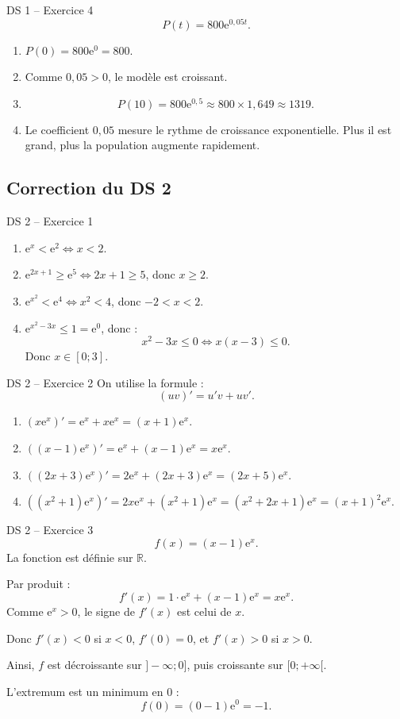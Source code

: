\documentclass[11pt,a4paper]{article}
\newcommand{\R}{\mathbb{R}}
\newcommand{\e}{\mathrm{e}}
\begin{document}
\begin{correctionbox}{DS 1 -- Exercice 4}
\[
P(t)=800\e^{0,05t}.
\]
\begin{enumerate}
    \item $P(0)=800\e^0=800$.
    \item Comme $0,05>0$, le modèle est croissant.
    \item
    \[
    P(10)=800\e^{0,5}\approx 800\times1,649\approx 1319.
    \]
    \item Le coefficient $0,05$ mesure le rythme de croissance exponentielle. Plus il est grand, plus la population augmente rapidement.
\end{enumerate}
\end{correctionbox}

\subsection{Correction du DS 2}

\begin{correctionbox}{DS 2 -- Exercice 1}
\begin{enumerate}
    \item $\e^x<\e^2 \Longleftrightarrow x<2$.
    \item $\e^{2x+1}\geq \e^5 \Longleftrightarrow 2x+1\geq5$, donc $x\geq2$.
    \item $\e^{x^2}<\e^4 \Longleftrightarrow x^2<4$, donc $-2<x<2$.
    \item $\e^{x^2-3x}\leq1=\e^0$, donc :
    \[
    x^2-3x\leq0
    \Longleftrightarrow x(x-3)\leq0.
    \]
    Donc $x\in[0;3]$.
\end{enumerate}
\end{correctionbox}

\begin{correctionbox}{DS 2 -- Exercice 2}
On utilise la formule :
\[
(uv)'=u'v+uv'.
\]
\begin{enumerate}
    \item $(x\e^x)'=\e^x+x\e^x=(x+1)\e^x$.
    \item $((x-1)\e^x)'=\e^x+(x-1)\e^x=x\e^x$.
    \item $((2x+3)\e^x)'=2\e^x+(2x+3)\e^x=(2x+5)\e^x$.
    \item $((x^2+1)\e^x)'=2x\e^x+(x^2+1)\e^x=(x^2+2x+1)\e^x=(x+1)^2\e^x$.
\end{enumerate}
\end{correctionbox}

\begin{correctionbox}{DS 2 -- Exercice 3}
\[
f(x)=(x-1)\e^x.
\]
La fonction est définie sur $\R$.

Par produit :
\[
f'(x)=1\cdot\e^x+(x-1)\e^x=x\e^x.
\]
Comme $\e^x>0$, le signe de $f'(x)$ est celui de $x$.

Donc $f'(x)<0$ si $x<0$, $f'(0)=0$, et $f'(x)>0$ si $x>0$.

Ainsi, $f$ est décroissante sur $]-\infty;0]$, puis croissante sur $[0;+\infty[$.

L'extremum est un minimum en $0$ :
\[
f(0)=(0-1)\e^0=-1.
\]
\end{correctionbox}
\end{document}
